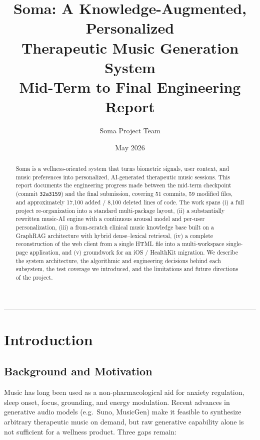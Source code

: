 \documentclass[11pt,a4paper]{article}
\title{
  \vspace{-1.5cm}
  \textbf{Soma: A Knowledge-Augmented, Personalized\\ Therapeutic Music Generation System}\\[0.4em]
  \large Mid-Term to Final Engineering Report
}
\author{Soma Project Team}
\date{May 2026}
\begin{document}
\maketitle

\begin{abstract}
\noindent
Soma is a wellness-oriented system that turns biometric signals, user context,
and music preferences into personalized, AI-generated therapeutic music
sessions. This report documents the engineering progress made between the
mid-term checkpoint (commit \texttt{32a3159}) and the final submission, covering
51 commits, 59 modified files, and approximately 17{,}100 added / 8{,}100
deleted lines of code. The work spans (i) a full project re-organization into a
standard multi-package layout, (ii) a substantially rewritten music-AI engine
with a continuous arousal model and per-user personalization, (iii) a from-scratch
clinical music knowledge base built on a GraphRAG architecture with hybrid
dense--lexical retrieval, (iv) a complete reconstruction of the web client from
a single HTML file into a multi-workspace single-page application, and
(v) groundwork for an iOS / HealthKit migration. We describe the system
architecture, the algorithmic and engineering decisions behind each subsystem,
the test coverage we introduced, and the limitations and future directions of
the project.
\end{abstract}

\tableofcontents
\vspace{1em}
\hrule
\vspace{1em}

\section{Introduction}

\subsection{Background and Motivation}

Music has long been used as a non-pharmacological aid for anxiety regulation,
sleep onset, focus, grounding, and energy modulation. Recent advances in
generative audio models (e.g.\ Suno, MusicGen) make it feasible to synthesize
arbitrary therapeutic music on demand, but raw generative capability alone is
not sufficient for a wellness product. Three gaps remain:
\end{document}
